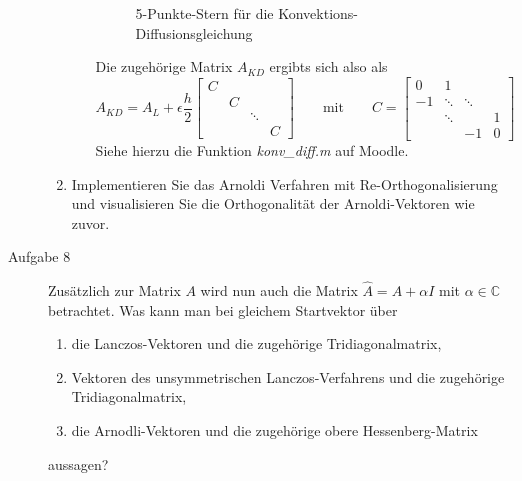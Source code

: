 \documentclass[a4paper,11pt]{scrartcl}
\begin{document}
\begin{description}
\begin{enumerate}
\begin{enumerate}[label=(\roman*)]
\begin{figure}[ht]
\begin{tikzpicture}
  \end{tikzpicture}
  \caption{5-Punkte-Stern für die Konvektions-Diffusionsgleichung}
  \label{figure:solving-CVP-bad-basis}
\end{figure}

Die zugehörige Matrix $A_{KD}$ ergibts sich also als\\
\begin{equation*}
A_{KD} = A_L + \epsilon \frac{h}{2} 
\begin{bmatrix}
C &&&\\
& C &&\\
&& \ddots &\\
&&& C
\end{bmatrix}
\qquad \text{mit} \qquad C = \begin{bmatrix}
0 & 1 &&\\
-1 & \ddots & \ddots &\\
&\ddots && 1\\
&&-1 & 0
\end{bmatrix}
\end{equation*}
		Siehe hierzu die Funktion \textit{konv\_diff.m} auf Moodle.
		\end{enumerate}
    \item Implementieren Sie das Arnoldi Verfahren mit Re-Orthogonalisierung und visualisieren Sie die Orthogonalität der Arnoldi-Vektoren wie zuvor.    
    \end{enumerate}
    \newpage
    
    \item[Aufgabe 8] Zusätzlich zur Matrix $A$ wird nun auch die Matrix $\hat{A} = A + \alpha I$ mit $\alpha \in \mathbb{C}$ betrachtet. Was kann man bei gleichem Startvektor über 
    \begin{enumerate}
    \item die Lanczos-Vektoren und die zugehörige Tridiagonalmatrix,
    \item Vektoren des unsymmetrischen Lanczos-Verfahrens und die zugehörige Tridiagonalmatrix,
    \item die Arnodli-Vektoren und die zugehörige obere Hessenberg-Matrix
    \end{enumerate}
    aussagen? 
    
\end{description}

\begin{hinweis}{
}\end{hinweis}
\end{document}
